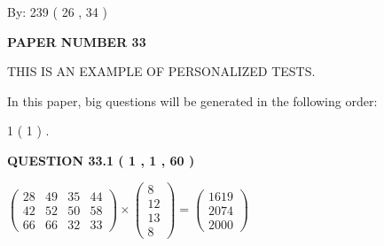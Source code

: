 \documentclass[12pt]{article}
\begin{document}
   
\hspace{1.0in} By: 
         239 (          26 ,           34 )
   
   
   
   
\newpage 
\setcounter{page}{ 
    33001 } 
   
   
   
   
 {\textbf{ \Large{ PAPER NUMBER           33  }}}
   
   
\vspace{0.2in}
   
   
   
   
   
   
 \vspace{0.2in}
{\Huge  THIS IS AN EXAMPLE OF}
{\Huge  PERSONALIZED TESTS. }
   
   
   
\vspace{0.2in}
   
In this paper, big questions will be generated in the following order: 
   
   
             1 (           1 )
 .
  
\vspace{0.2in}
  
{\textbf{\Large{QUESTION
33.1 
 (           1 ,           1 ,          60 )
}}}
  
  
 
 
\noindent{}

 
$\left( \begin{array}{ccccccccccccccc}
          28  & 
          49  & 
          35  & 
          44  \\ 
          42  & 
          52  & 
          50  & 
          58  \\ 
          66  & 
          66  & 
          32  & 
          33
\end{array}\right) \times
\left( \begin{array}{c}
           8  \\ 
          12  \\ 
          13  \\ 
           8
\end{array}\right)  =
\left( \begin{array}{c}
        1619  \\ 
        2074  \\ 
        2000
\end{array}\right)  $
 
\end{document}
